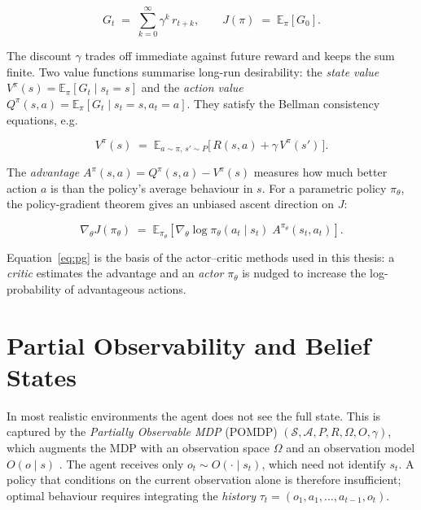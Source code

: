 \begin{equation}
    G_t \;=\; \sum_{k=0}^{\infty} \gamma^{k}\, r_{t+k},
    \qquad
    J(\pi) \;=\; \mathbb{E}_{\pi}\!\left[G_0\right].
    \label{eq:return}
\end{equation}

The discount $\gamma$ trades off immediate against future reward and keeps the
sum finite. Two value functions summarise long-run desirability: the
\emph{state value} $V^{\pi}(s) = \mathbb{E}_{\pi}[G_t \mid s_t = s]$ and the
\emph{action value} $Q^{\pi}(s,a) = \mathbb{E}_{\pi}[G_t \mid s_t = s, a_t = a]$.
They satisfy the Bellman consistency equations, e.g.

\begin{equation}
    V^{\pi}(s) \;=\; \mathbb{E}_{a\sim\pi,\, s'\sim P}
        \big[\, R(s,a) + \gamma\, V^{\pi}(s') \,\big].
    \label{eq:bellman}
\end{equation}

The \emph{advantage} $A^{\pi}(s,a) = Q^{\pi}(s,a) - V^{\pi}(s)$ measures how much
better action $a$ is than the policy's average behaviour in $s$. For a
parametric policy $\pi_\theta$, the policy-gradient theorem gives an unbiased
ascent direction on $J$:

\begin{equation}
    \nabla_\theta J(\pi_\theta) \;=\;
        \mathbb{E}_{\pi_\theta}\!\left[
            \nabla_\theta \log \pi_\theta(a_t \mid s_t)\; A^{\pi_\theta}(s_t, a_t)
        \right].
    \label{eq:pg}
\end{equation}

Equation~\eqref{eq:pg} is the basis of the actor--critic methods used in this
thesis: a \emph{critic} estimates the advantage and an \emph{actor}
$\pi_\theta$ is nudged to increase the log-probability of advantageous actions.

\section{Partial Observability and Belief States}
\label{sec:bg-pomdp}

In most realistic environments the agent does not see the full state. This is
captured by the \emph{Partially Observable MDP} (POMDP)
$(\mathcal{S}, \mathcal{A}, P, R, \Omega, O, \gamma)$, which augments the MDP
with an observation space $\Omega$ and an observation model $O(o \mid s)$
\citep{kaelbling1998planning}. The agent receives only $o_t \sim O(\cdot \mid
s_t)$, which need not identify $s_t$. A policy that conditions on the current
observation alone is therefore insufficient; optimal behaviour requires
integrating the \emph{history} $\tau_t = (o_1, a_1, \dots, a_{t-1}, o_t)$.

